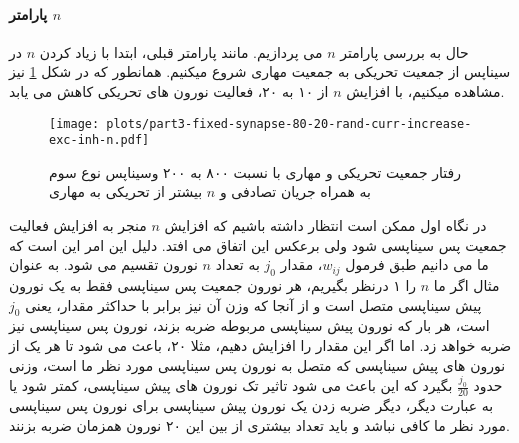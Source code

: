         \paragraph*{پارامتر $n$}
            حال به بررسی پارامتر 
            $n$ 
            می پردازیم. مانند پارامتر قبلی، ابتدا با زیاد کردن 
            $n$ 
            در سیناپس از جمعیت تحریکی به جمعیت مهاری شروع میکنیم. 
            همانطور که در شکل 
            \ref{fig:part3-fixed-synapse-80-20-rand-curr-increase-exc-inh-n}
            نیز مشاهده میکنیم، با افزایش 
            $n$ 
            از ۱۰ به ۲۰، فعالیت نورون های تحریکی کاهش می یابد.
            \begin{figure}[!ht]
                \centering
                \texttt{[image: plots/part3-fixed-synapse-80-20-rand-curr-increase-exc-inh-n.pdf]} 
                \caption{رفتار جمعیت تحریکی و مهاری با نسبت ۸۰۰ به ۲۰۰ وسیناپس نوع سوم به همراه جریان تصادفی و $n$ بیشتر از تحریکی به مهاری}
                \label{fig:part3-fixed-synapse-80-20-rand-curr-increase-exc-inh-n}
            \end{figure}
            
            در نگاه اول ممکن است انتظار داشته باشیم که افزایش 
            $n$ 
            منجر به افزایش فعالیت جمعیت پس سیناپسی شود ولی برعکس این اتفاق می افتد. دلیل این امر این است که ما می دانیم طبق فرمول 
            $w_{ij}$، 
            مقدار 
            $j_0$ 
            به تعداد 
            $n$ 
            نورون تقسیم می شود. به عنوان مثال اگر ما 
            $n$ 
            را ۱ درنظر بگیریم، هر نورون جمعیت پس سیناپسی فقط به یک نورون پیش سیناپسی متصل است و از آنجا که وزن آن نیز برابر با حداکثر مقدار، یعنی 
            $j_0$ 
            است، هر بار که نورون پیش سیناپسی مربوطه ضربه بزند، نورون پس سیناپسی نیز ضربه خواهد زد. اما اگر این مقدار را افزایش دهیم، مثلا ۲۰، 
            باعث می شود تا هر یک از نورون های پیش سیناپسی که متصل به نورون پس سیناپسی مورد نظر ما است، 
            وزنی حدود 
            $\frac{j_0}{20}$ 
            بگیرد که این باعث می شود تاثیر  تک نورون های پیش سیناپسی، کمتر شود یا به عبارت دیگر، دیگر ضربه زدن یک نورون پیش سیناپسی برای نورون پس سیناپسی مورد نظر ما کافی نباشد و باید تعداد بیشتری از بین این ۲۰ نورون همزمان ضربه بزنند.
        
